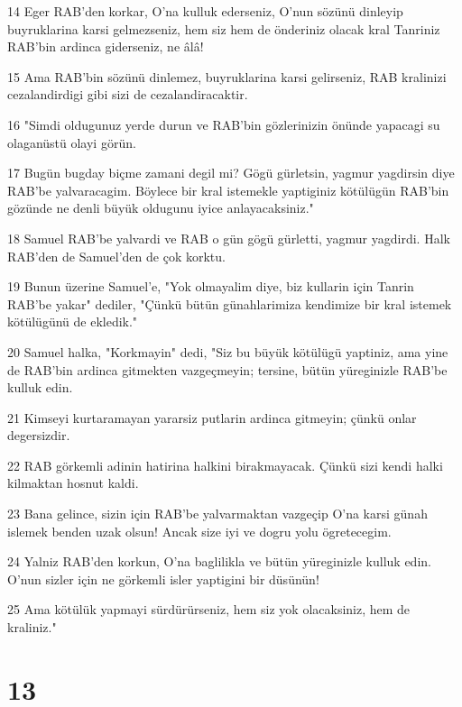 \par 14 Eger RAB'den korkar, O'na kulluk ederseniz, O'nun sözünü dinleyip buyruklarina karsi gelmezseniz, hem siz hem de önderiniz olacak kral Tanriniz RAB'bin ardinca giderseniz, ne âlâ!
\par 15 Ama RAB'bin sözünü dinlemez, buyruklarina karsi gelirseniz, RAB kralinizi cezalandirdigi gibi sizi de cezalandiracaktir.
\par 16 "Simdi oldugunuz yerde durun ve RAB'bin gözlerinizin önünde yapacagi su olaganüstü olayi görün.
\par 17 Bugün bugday biçme zamani degil mi? Gögü gürletsin, yagmur yagdirsin diye RAB'be yalvaracagim. Böylece bir kral istemekle yaptiginiz kötülügün RAB'bin gözünde ne denli büyük oldugunu iyice anlayacaksiniz."
\par 18 Samuel RAB'be yalvardi ve RAB o gün gögü gürletti, yagmur yagdirdi. Halk RAB'den de Samuel'den de çok korktu.
\par 19 Bunun üzerine Samuel'e, "Yok olmayalim diye, biz kullarin için Tanrin RAB'be yakar" dediler, "Çünkü bütün günahlarimiza kendimize bir kral istemek kötülügünü de ekledik."
\par 20 Samuel halka, "Korkmayin" dedi, "Siz bu büyük kötülügü yaptiniz, ama yine de RAB'bin ardinca gitmekten vazgeçmeyin; tersine, bütün yüreginizle RAB'be kulluk edin.
\par 21 Kimseyi kurtaramayan yararsiz putlarin ardinca gitmeyin; çünkü onlar degersizdir.
\par 22 RAB görkemli adinin hatirina halkini birakmayacak. Çünkü sizi kendi halki kilmaktan hosnut kaldi.
\par 23 Bana gelince, sizin için RAB'be yalvarmaktan vazgeçip O'na karsi günah islemek benden uzak olsun! Ancak size iyi ve dogru yolu ögretecegim.
\par 24 Yalniz RAB'den korkun, O'na baglilikla ve bütün yüreginizle kulluk edin. O'nun sizler için ne görkemli isler yaptigini bir düsünün!
\par 25 Ama kötülük yapmayi sürdürürseniz, hem siz yok olacaksiniz, hem de kraliniz."

\chapter{13}

